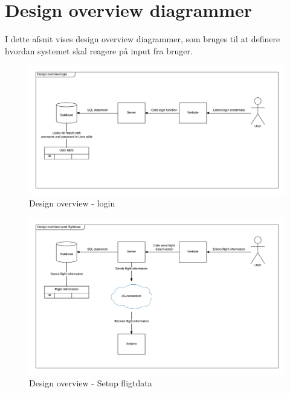 \section{Design overview diagrammer}

I dette afsnit vises design overview diagrammer, som bruges til at definere hvordan systemet skal reagere på input fra bruger.

\vspace{-5pt}
\begin{figure}[H]
	\centering
	\includegraphics[width=1\textwidth]{Billeder/Design_overview/design_overview_login}
	\vspace{-1cm}
	\caption{Design overview - login}
	\label{fig:pakke_diagram}
\end{figure}

\vspace{-5pt}
\begin{figure}[H]
	\centering
	\includegraphics[width=1\textwidth]{Billeder/Design_overview/design_overview_setupFlightdata}
	\vspace{-1cm}
	\caption{Design overview - Setup fligtdata}
	\label{fig:pakke_diagram}
\end{figure}